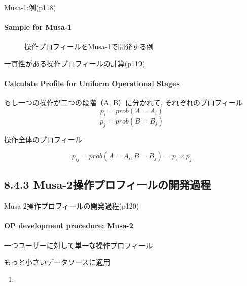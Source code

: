 \begin{frame}{Musa-1:例(p118)}
\framesubtitle{Sample for Musa-1}
\begin{figure}
\caption{操作プロフィールをMusa-1で開発する例}
\end{figure}
\end{frame}
\begin{frame}{一貫性がある操作プロフィールの計算(p119)}
\framesubtitle{Calculate Profile for Uniform Operational Stages}
もし一つの操作が二つの段階（A, B）に分かれて, それぞれのプロフィール
\[p_i=prob(A=A_i)\]
\[p_j=prob(B=B_j)\]

操作全体のプロフィール

\[p_{ij}=prob(A=A_i,B=B_j)=p_i \times p_j\]
\end{frame}
\subsection{8.4.3 Musa-2操作プロフィールの開発過程}
\begin{frame}{Musa-2操作プロフィールの開発過程(p120)}
\framesubtitle{OP development procedure: Musa-2}
\begin{definationfc}[Musa-2]
一つユーザーに対して単一な操作プロフィール

もっと小さいデータソースに適用
\end{definationfc}

\pause

\begin{enumerate}
\item
\end{enumerate}

\end{frame}

